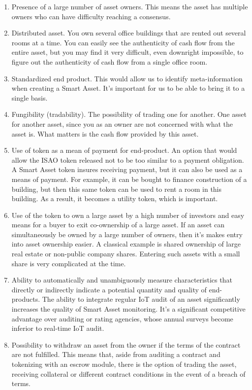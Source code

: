 \documentclass{article}
\begin{document}
\begin{multicols}{2}
\begin{enumerate}[label=(\alph*)]
\item Presence of a large number of asset owners. This means the asset has multiple owners who can have difficulty reaching a consensus. 
\item Distributed asset. You own several office buildings that are rented out several rooms at a time. You can easily see the authenticity of cash flow from the entire asset, but you may find it very difficult, even downright impossible, to figure out the authenticity of cash flow from a single office room. 
\item Standardized end product. This would allow us to identify meta-information when creating a Smart Asset. It’s important for us to be able to bring it to a single basis. 
\item Fungibility (tradability). The possibility of trading one for another. One asset for another asset,  since you as an owner are not concerned with what the asset is. What matters is the cash flow provided by this asset.
\item Use of token as a mean of payment for end-product. An option that would allow the ISAO token released not to be too similar to a payment obligation. A Smart Asset token insures receiving payment, but it can also be used as a means of payment. For example, it can be bought to finance construction of a building, but then this same token can be used to rent a room in this building. As a result, it becomes a utility token, which is important. 
\item Use of the token to own a large asset by a high number of investors and easy means for a buyer to exit co-ownership of a large asset. If an asset can simultaneously be owned by a large number of owners, then it’s makes entry into asset ownership easier. A classical example is shared ownership of large real estate or non-public company shares. Entering such assets with a small share is very complicated at the time.
\item Ability to automatically and unambiguously measure characteristics that directly or indirectly 
indicate a potential quantity and quality of end-products. The ability to integrate regular IoT audit of an asset significantly increases the quality of Smart Asset monitoring. It’s a significant competitive advantage over auditing or rating agencies, whose annual surveys become inferior to real-time IoT audit. 
\item Possibility to withdraw an asset from the owner if the terms of the contract are not fulfilled. This means that, aside from auditing a contract and tokenizing with an escrow module, there is the option of trading the asset, receiving collateral or different contract conditions in the event of a breach of terms. 

\end{enumerate}
\end{multicols}
\end{document}
